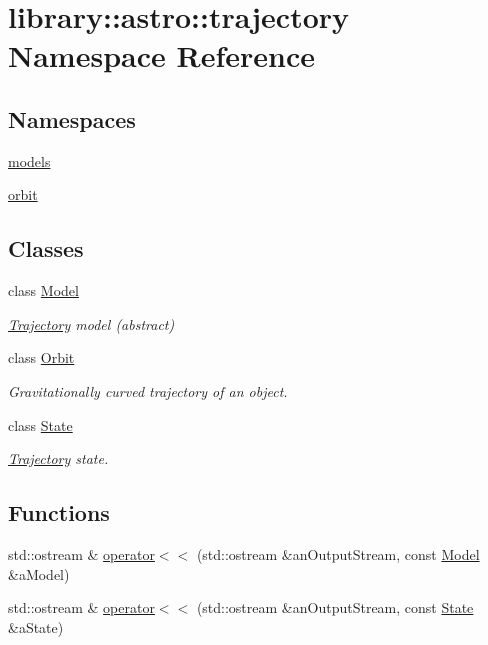 \hypertarget{namespacelibrary_1_1astro_1_1trajectory}{}\section{library\+:\+:astro\+:\+:trajectory Namespace Reference}
\label{namespacelibrary_1_1astro_1_1trajectory}
\subsection*{Namespaces}
\begin{DoxyCompactItemize}
\item 
 \hyperlink{namespacelibrary_1_1astro_1_1trajectory_1_1models}{models}
\item 
 \hyperlink{namespacelibrary_1_1astro_1_1trajectory_1_1orbit}{orbit}
\end{DoxyCompactItemize}
\subsection*{Classes}
\begin{DoxyCompactItemize}
\item 
class \hyperlink{classlibrary_1_1astro_1_1trajectory_1_1_model}{Model}
\begin{DoxyCompactList}\small\item\em \hyperlink{classlibrary_1_1astro_1_1_trajectory}{Trajectory} model (abstract) \end{DoxyCompactList}\item 
class \hyperlink{classlibrary_1_1astro_1_1trajectory_1_1_orbit}{Orbit}
\begin{DoxyCompactList}\small\item\em Gravitationally curved trajectory of an object. \end{DoxyCompactList}\item 
class \hyperlink{classlibrary_1_1astro_1_1trajectory_1_1_state}{State}
\begin{DoxyCompactList}\small\item\em \hyperlink{classlibrary_1_1astro_1_1_trajectory}{Trajectory} state. \end{DoxyCompactList}\end{DoxyCompactItemize}
\subsection*{Functions}
\begin{DoxyCompactItemize}
\item 
std\+::ostream \& \hyperlink{namespacelibrary_1_1astro_1_1trajectory_af5701f69fca5faeab4247331d0348f6c}{operator$<$$<$} (std\+::ostream \&an\+Output\+Stream, const \hyperlink{classlibrary_1_1astro_1_1trajectory_1_1_model}{Model} \&a\+Model)
\item 
std\+::ostream \& \hyperlink{namespacelibrary_1_1astro_1_1trajectory_a99391ca9edb771c6bd792e4a7366bf14}{operator$<$$<$} (std\+::ostream \&an\+Output\+Stream, const \hyperlink{classlibrary_1_1astro_1_1trajectory_1_1_state}{State} \&a\+State)
\end{DoxyCompactItemize}


